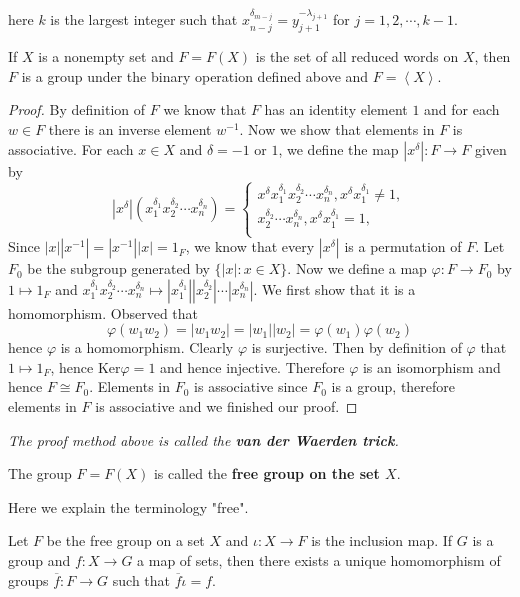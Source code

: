 here $k$ is the largest integer such that $x_{n-j}^{\delta_{m-j}}=y_{j+1}^{-\lambda_{j+1}}$ for $j=1,2,\cdots,k-1$.
\begin{theorem}
If $X$ is a nonempty set and $F=F(X)$ is the set of all reduced words on $X$, then $F$ is a group under the binary operation defined above and $F=\left<X\right>$.
\end{theorem}
\begin{proof}
By definition of $F$ we know that $F$ has an identity element $1$ and for each $w\in F$ there is an inverse element $w^{-1}$. Now we show that elements in $F$ is associative. For each $x\in X$ and $\delta=-1$ or $1$, we define the map $|x^\delta|:F\to F$ given by 
$$
\left| x^{\delta} \right|\left( x_{1}^{\delta _1}x_{2}^{\delta _2}\cdots x_{n}^{\delta _n} \right) =\begin{cases}
	x^{\delta}x_{1}^{\delta _1}x_{2}^{\delta _2}\cdots x_{n}^{\delta _n},x^{\delta}x_{1}^{\delta _1}\ne 1,\\
	x_{2}^{\delta _2}\cdots x_{n}^{\delta _n},x^{\delta}x_1^{\delta_1}=1,\\
\end{cases}
$$
Since $|x||x^{-1}|=|x^{-1}||x|=1_F$, we know that every $|x^\delta|$ is a permutation of $F$. Let $F_0$ be the subgroup generated by $\{|x|:x\in X\}$. Now we define a map $\varphi:F\to F_0$ by $1\mapsto 1_F$ and $x_{1}^{\delta _1}x_{2}^{\delta _2}\cdots x_{n}^{\delta _n}\mapsto \left| x_{1}^{\delta _1} \right|\left| x_{2}^{\delta _2} \right|\cdots \left| x_{n}^{\delta _n} \right|$. We first show that it is a homomorphism. Observed that 
$$
\varphi \left( w_1w_2 \right) =\left| w_1w_2 \right|=\left| w_1 \right|\left| w_2 \right|=\varphi \left( w_1 \right) \varphi \left( w_2 \right) 
$$
hence $\varphi$ is a homomorphism. Clearly $\varphi$ is surjective. Then by definition of $\varphi$ that $1\mapsto 1_F$, hence $\mathrm{Ker}\varphi=1$ and hence injective. Therefore $\varphi$ is an isomorphism and hence $F\cong F_0$. Elements in $F_0$ is associative since $F_0$ is a group, therefore elements in $F$ is associative and we finished our proof.
\end{proof}
\begin{note}\em
The proof method above is called the \textbf{van der Waerden trick}.
\end{note}
\begin{definition}
The group $F=F(X)$ is called the \textbf{free group on the set $X$}.
\end{definition}
Here we explain the terminology "free".
\begin{theorem}
Let $F$ be the free group on a set $X$ and $\iota:X\to F$ is the inclusion map. If $G$ is a group and $f:X\to G$ a map of sets, then there exists a unique homomorphism of groups $\overline{f}:F\to G$ such that $\overline{f}\iota=f$.
\end{theorem}
